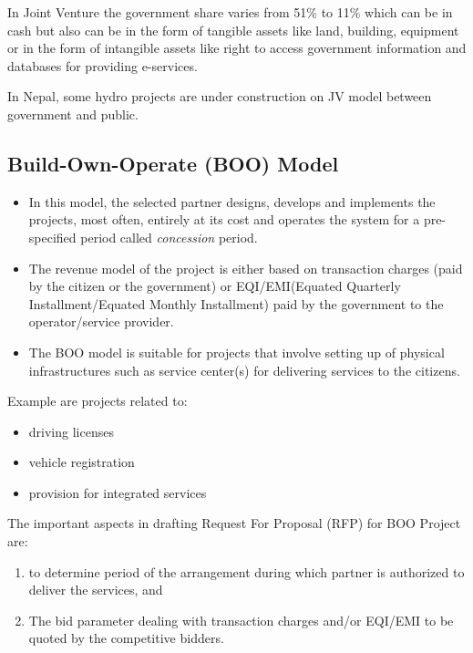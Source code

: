 In Joint Venture the government share varies from 51\% to 11\% which can be in cash but also can be in the form of tangible assets like land, building, equipment or in the form of intangible assets like right to access government information and databases for providing e-services.

In Nepal, some hydro projects are under construction on JV model between government and public.

\subsection[BOO Model]{Build-Own-Operate (BOO) Model}
\begin{itemize}
	\item In this model, the selected partner designs, develops and implements the projects, most often, entirely at its cost and operates the system for a pre-specified period called \textit{concession} period.
	\item The revenue model of the project is either based on transaction charges (paid by the citizen or the government) or EQI/EMI(Equated Quarterly Installment/Equated Monthly Installment) paid by the government to the operator/service provider.
	\item The BOO model is suitable for projects that involve setting up of physical infrastructures such as service center(s) for delivering services to the citizens. 
\end{itemize}

Example are projects related to:
\begin{multicols}{2}
	\begin{itemize}
	\item driving licenses
	\item vehicle registration
	\item provision for integrated services
	\end{itemize}
\end{multicols}

The important aspects in drafting Request For Proposal (RFP) for BOO Project are:
\begin{enumerate}[label=(\alph*)]
	\item to determine period of the arrangement during which partner is authorized to deliver the services, and
	\item The bid parameter dealing with transaction charges and/or EQI/EMI to be quoted by the competitive bidders.
\end{enumerate}

